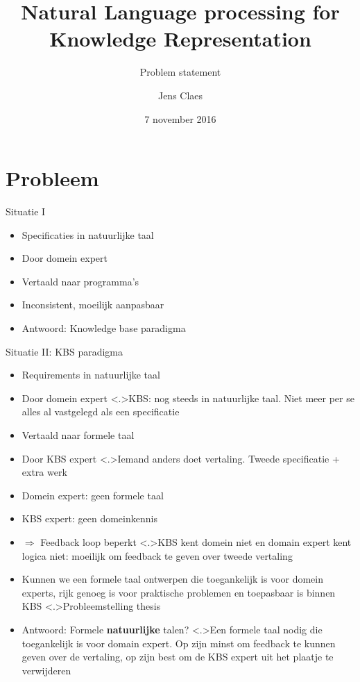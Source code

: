 \documentclass[notes]{beamer}
\title{Natural Language processing for Knowledge Representation}
\subtitle{Problem statement}
\author{Jens Claes}
\date{7 november 2016}
\newcommand{\seperation}{
	\vspace{1em}
	\ppause
}
\newcommand{\hitem}{
	\ppause
	\item
}
\newcommand{\ppause}{\onslide<+>}
\newcommand{\nnote}[1]{\note<.>{#1}}
\begin{document}
	\frame{\titlepage}
	\section{Probleem}
	\begin{frame}{Situatie I}
		\begin{itemize}
			\hitem Specificaties in natuurlijke taal
			\item Door domein expert
			
			\seperation
			
			\item Vertaald naar programma's
			\item Inconsistent, moeilijk aanpasbaar
			
			\seperation
			
			\item Antwoord: Knowledge base paradigma
		\end{itemize}
		
	\end{frame}
	\begin{frame}{Situatie II: KBS paradigma}
			\begin{itemize}
				\hitem Requirements in natuurlijke taal
				\item Door domein expert
				\nnote{KBS: nog steeds in natuurlijke taal. Niet meer per se alles al vastgelegd als een specificatie}
				
				\seperation
				
				\item Vertaald naar formele taal
				\item Door KBS expert
				\nnote{Iemand anders doet vertaling. Tweede specificatie + extra werk}
				
				\seperation
				
				\item Domein expert: geen formele taal
				\item KBS expert: geen domeinkennis
				\item $\Rightarrow$ Feedback loop beperkt
				\nnote{KBS kent domein niet en domain expert kent logica niet: moeilijk om feedback te geven over tweede vertaling}
				
				\seperation
				
				\item Kunnen we een formele taal ontwerpen die toegankelijk is voor domein experts, rijk genoeg is voor praktische problemen en toepasbaar is binnen KBS
				\nnote{Probleemstelling thesis}
				
				\seperation
				
				\item Antwoord: Formele \textbf{natuurlijke} talen?
				\nnote{Een formele taal nodig die toegankelijk is voor domain expert. Op zijn minst om feedback te kunnen geven over de vertaling, op zijn best om de KBS expert uit het plaatje te verwijderen}
			\end{itemize}
	\end{frame}
	
\end{document}
